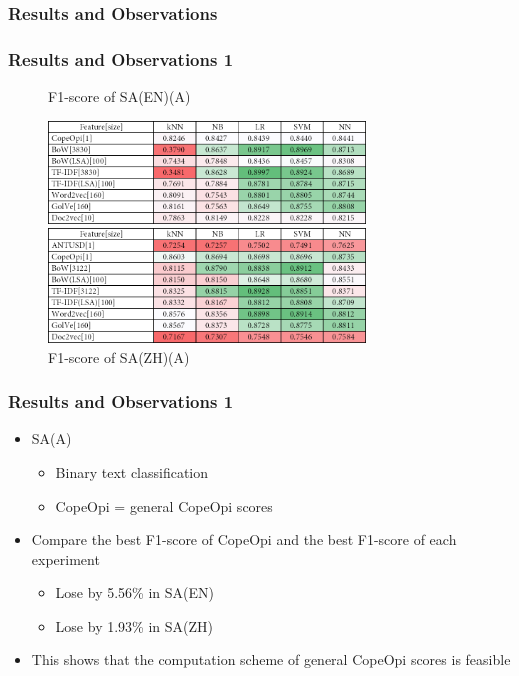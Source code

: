 \documentclass[mathserif]{beamer}
\newcommand\expfigvspace{-2.5ex}
\begin{document}
\subsubsection{Results and Observations}
\begin{frame}
\frametitle{Results and Observations 1}
	\vspace{\expfigvspace}
	\begin{figure}
	\centering
	\caption{F1-score of SA(EN)(A)}
	\includegraphics[width=0.75\textwidth]{./figure/01A1.png}
	\caption{F1-score of SA(ZH)(A)}
	\includegraphics[width=0.75\textwidth]{./figure/02A1.png}
	\end{figure}
\end{frame}
\begin{frame}
\frametitle{Results and Observations 1}
	\begin{itemize}
	\item SA(A)
		\begin{itemize}
		\item Binary text classification
		\item CopeOpi = general CopeOpi scores
		\end{itemize}
	\item Compare the best F1-score of CopeOpi and the best F1-score of each experiment
		\begin{itemize}
		\item Lose by 5.56\% in SA(EN)
		\item Lose by 1.93\% in SA(ZH)
		\end{itemize}
	\item This shows that the computation scheme of general CopeOpi scores is feasible
	\end{itemize}
\end{frame}
\end{document}
